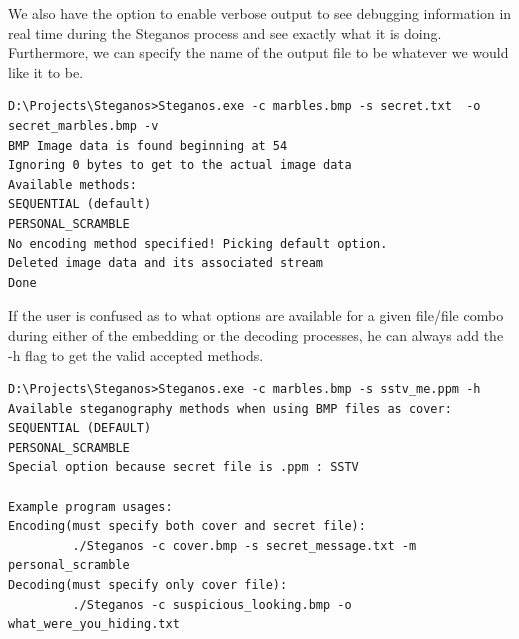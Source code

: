 We also have the option to enable verbose output to see debugging information in real time during the Steganos process and see exactly what it is doing. Furthermore, we can specify the name of the output file to be whatever we would like it to be.
\begin{verbatim}
D:\Projects\Steganos>Steganos.exe -c marbles.bmp -s secret.txt  -o secret_marbles.bmp -v
BMP Image data is found beginning at 54
Ignoring 0 bytes to get to the actual image data
Available methods:
SEQUENTIAL (default)
PERSONAL_SCRAMBLE
No encoding method specified! Picking default option.
Deleted image data and its associated stream
Done
\end{verbatim}

If the user is confused as to what options are available for a given file/file combo during either of the embedding or the decoding processes, he can always add the -h flag to get the valid accepted methods.
\begin{verbatim}
D:\Projects\Steganos>Steganos.exe -c marbles.bmp -s sstv_me.ppm -h
Available steganography methods when using BMP files as cover:
SEQUENTIAL (DEFAULT)
PERSONAL_SCRAMBLE
Special option because secret file is .ppm : SSTV

Example program usages:
Encoding(must specify both cover and secret file):
         ./Steganos -c cover.bmp -s secret_message.txt -m personal_scramble
Decoding(must specify only cover file):
         ./Steganos -c suspicious_looking.bmp -o what_were_you_hiding.txt
\end{verbatim}

